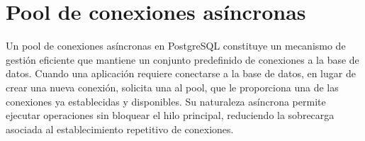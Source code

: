 \section{Pool de conexiones asíncronas}
\label{anexo:pool}
Un pool de conexiones asíncronas en PostgreSQL constituye un mecanismo de gestión eficiente que mantiene un conjunto predefinido de conexiones a la base de datos. Cuando una aplicación requiere conectarse a la base de datos, en lugar de crear una nueva conexión, solicita una al pool, que le proporciona una de las conexiones ya establecidas y disponibles. Su naturaleza asíncrona permite ejecutar operaciones sin bloquear el hilo principal, reduciendo la sobrecarga asociada al establecimiento repetitivo de conexiones.


